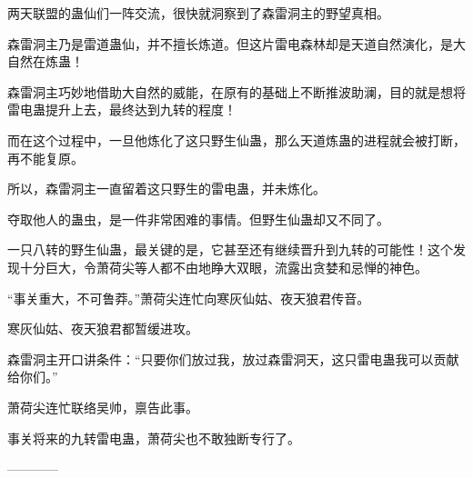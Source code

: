 \begin{this_body}
两天联盟的蛊仙们一阵交流，很快就洞察到了森雷洞主的野望真相。

森雷洞主乃是雷道蛊仙，并不擅长炼道。但这片雷电森林却是天道自然演化，是大自然在炼蛊！

森雷洞主巧妙地借助大自然的威能，在原有的基础上不断推波助澜，目的就是想将雷电蛊提升上去，最终达到九转的程度！

而在这个过程中，一旦他炼化了这只野生仙蛊，那么天道炼蛊的进程就会被打断，再不能复原。

所以，森雷洞主一直留着这只野生的雷电蛊，并未炼化。

夺取他人的蛊虫，是一件非常困难的事情。但野生仙蛊却又不同了。

一只八转的野生仙蛊，最关键的是，它甚至还有继续晋升到九转的可能性！这个发现十分巨大，令萧荷尖等人都不由地睁大双眼，流露出贪婪和忌惮的神色。

“事关重大，不可鲁莽。”萧荷尖连忙向寒灰仙姑、夜天狼君传音。

寒灰仙姑、夜天狼君都暂缓进攻。

森雷洞主开口讲条件：“只要你们放过我，放过森雷洞天，这只雷电蛊我可以贡献给你们。”

萧荷尖连忙联络吴帅，禀告此事。

事关将来的九转雷电蛊，萧荷尖也不敢独断专行了。

------------

\end{this_body}


